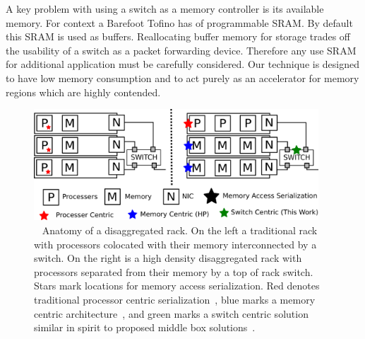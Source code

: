 A key problem with using a switch as a memory controller is its
available memory. For context a Barefoot Tofino has  of
programmable SRAM. By default this SRAM is used as buffers.
Reallocating buffer memory for storage trades off the usability of a
switch as a packet forwarding device. Therefore any use SRAM for
additional application must be carefully considered. 
Our technique is designed to have low memory consumption and to act
purely as an accelerator for memory regions which are highly
contended. 





\begin{figure}
      \centering
      \includegraphics[width=0.95\textwidth]{fig/overview.png}
      \caption{~
      Anatomy of a disaggregated rack. On the left a
      traditional rack with processors colocated with their memory
      interconnected by a switch. On the right is a high density
      disaggregated rack with processors separated from their memory
      by a top of rack switch. Stars mark locations for memory access
      serialization. Red denotes traditional processor centric
      serialization~\cite{memc3, cell, sonuma, storm, clover}, blue marks a
      memory centric architecture~\cite{aguilera2019designing}, and
      green marks a switch centric solution similar in spirit to
      proposed middle box solutions~\cite{254120}.
      \label{fig:overview}
      }
\end{figure}



